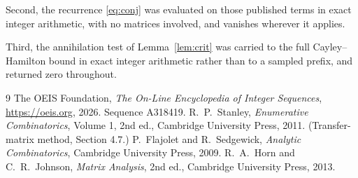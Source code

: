 \documentclass[11pt,a4paper]{article}
\theoremstyle{plain}
\theoremstyle{definition}
\begin{document}
Second, the recurrence \eqref{eq:conj} was evaluated on those published terms in exact
integer arithmetic, with no matrices involved, and vanishes wherever it applies.

Third, the annihilation test of Lemma~\ref{lem:crit} was carried to the full
Cayley--Hamilton bound in exact integer arithmetic rather than to a sampled prefix, and
returned zero throughout.

\begin{thebibliography}{9}
 The OEIS Foundation, \emph{The On-Line Encyclopedia of Integer
Sequences}, \url{https://oeis.org}, 2026. Sequence A318419.
 R.~P.~Stanley, \emph{Enumerative Combinatorics}, Volume 1, 2nd ed.,
Cambridge University Press, 2011. (Transfer-matrix method, Section 4.7.)
 P.~Flajolet and R.~Sedgewick, \emph{Analytic Combinatorics}, Cambridge
University Press, 2009.
 R.~A.~Horn and C.~R.~Johnson, \emph{Matrix Analysis}, 2nd ed., Cambridge
University Press, 2013.
\end{thebibliography}
\end{document}
